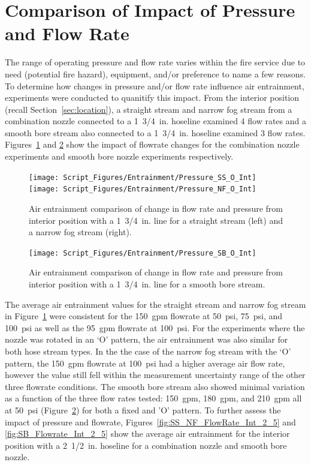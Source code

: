\documentclass[12pt,oneside]{book}
\begin{document}
\section{Comparison of Impact of Pressure and Flow Rate}
\label{sec:pressure}
The range of operating pressure and flow rate varies within the fire service due to need (potential fire hazard), equipment, and/or preference to name a few reasons. To determine how changes in pressure and/or flow rate influence air entrainment, experiments were conducted to quanitify this impact. From the interior position (recall Section~\ref{sec:location}), a straight stream and narrow fog stream from a combination nozzle connected to a 1~3/4~in. hoseline examined 4 flow rates and a smooth bore stream also connected to a 1~3/4~in. hoseline examined 3 flow rates. Figures~\ref{fig:SS_NF_FlowRate_Int} and \ref{fig:SB_Flowrate_Int} show the impact of flowrate changes for the combination nozzle experiments and smooth bore nozzle experiments respectively.

\begin{figure}[!ht]
\centering
\texttt{[image: Script\_Figures/Entrainment/Pressure\_SS\_O\_Int]}
\texttt{[image: Script\_Figures/Entrainment/Pressure\_NF\_O\_Int]}
\caption[Air Entrainment Comparison of Pressure and Flow Rate for Interior Combination Nozzle from 1~3/4~in. Line]{Air entrainment comparison of change in flow rate and pressure from interior position with a 1~3/4~in. line for a straight stream (left) and a narrow fog stream (right).}
\label{fig:SS_NF_FlowRate_Int}
\end{figure}

\begin{figure}[!ht]
\centering
\texttt{[image: Script\_Figures/Entrainment/Pressure\_SB\_O\_Int]}
\caption[Air Entrainment Comparison of Pressure and Flow Rate for Interior Smooth Bore Nozzle from 1~3/4~in. Line]{Air entrainment comparison of change in flow rate and pressure from interior position with a 1~3/4~in. line for a smooth bore stream.}
\label{fig:SB_Flowrate_Int}
\end{figure}

The average air entrainment values for the straight stream and narrow fog stream in Figure~\ref{fig:SS_NF_FlowRate_Int} were consistent for the 150~gpm flowrate at 50~psi, 75~psi, and 100~psi as well as the 95~gpm flowrate at 100~psi. For the experiments where the nozzle was rotated in an `O' pattern, the air entrainment was also similar for both hose stream types. In the the case of the narrow fog stream with the `O' pattern, the 150~gpm flowrate at 100~psi had a higher average air flow rate, however the value still fell within the measurement uncertainty range of the other three flowrate conditions. The smooth bore stream also showed minimal variation as a function of the three flow rates tested: 150~gpm, 180~gpm, and 210~gpm all at 50~psi (Figure~\ref{fig:SB_Flowrate_Int}) for both a fixed and 'O' pattern. To further assess the impact of pressure and flowrate, Figures~\ref{fig:SS_NF_FlowRate_Int_2_5} and \ref{fig:SB_Flowrate_Int_2_5} show the average air entrainment for the interior position with a 2~1/2~in. hoseline for a combination nozzle and smooth bore nozzle.
\end{document}
